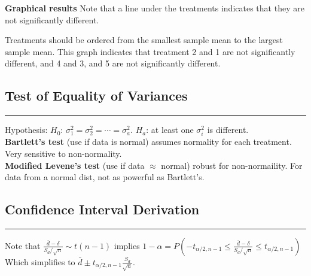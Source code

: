 \documentclass[10pt]{article}
\begin{document}
\begin{flushleft}
\textbf{Graphical results} Note that a line under the treatments indicates that they are not significantly different. \\
\end{flushleft}
\begin{multicols}{2}
\begin{flushleft}
\end{flushleft}
  
  \noindent Treatments should be ordered from the smallest sample mean to the largest sample mean. This graph indicates that treatment 2 and 1 are not significantly different, and 4 and 3, and 5 are not significantly different.
\end{multicols}

\subsection*{Test of Equality of Variances}
\hrule width 8cm
\vspace{6pt}
Hypothesis: $H_0$: $\sigma_1^2 = \sigma_2^2 = \cdots = \sigma_a^2$. $H_a$: at least one $\sigma_i^2$ is different.\\
\textbf{Bartlett's test} (use if data is normal) assumes normality for each treatment. Very sensitive to non-normality.\\
\textbf{Modified Levene's test} (use if data $\approx$ normal) robust for non-normaility. For data from a normal dist, not as powerful as Bartlett's.

\subsection*{Confidence Interval Derivation}
\hrule width 8cm
\vspace{6pt}
Note that 
$\frac{\bar{d} - \delta}{S_d / \sqrt{n}} \sim t(n-1)$ implies $1-\alpha = P\left(-t_{\alpha/2, n-1} \leq \frac{\bar{d} - \delta}{S_d / \sqrt{n}} \leq t_{\alpha/2, n-1} \right)$
Which simplifies to $\bar{d} \pm t_{\alpha/2, n-1} \frac{S_d}{\sqrt{n}}$.
\end{document}
